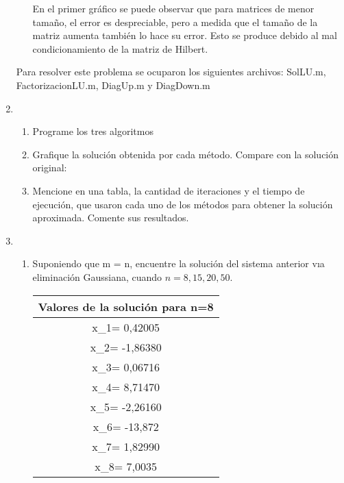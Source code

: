\documentclass{udpreport}
\begin{document}
\begin{enumerate}
\begin{enumerate}
\begin{figure}[H]
 			\end{figure}
 		
 			En el primer gráfico se puede observar que para matrices de menor tamaño, el error es despreciable, pero a medida que el tamaño de la matriz aumenta también lo hace su error. Esto se produce debido al mal condicionamiento de la matriz de Hilbert.
 		\end{enumerate}
 		
 	Para resolver este problema se ocuparon los siguientes archivos: SolLU.m, FactorizacionLU.m, DiagUp.m y DiagDown.m	
 	\newpage
 		\item
 	 \begin{enumerate}
 	    \item Programe los tres algoritmos
 	    \item  Grafique la solución obtenida por cada método. Compare con la solución original:
 	    \item Mencione en una tabla, la cantidad de iteraciones y el tiempo de ejecución, que usaron cada uno de los métodos para obtener la solución aproximada. Comente sus resultados.
 	  \end{enumerate}
      
        \item
                \begin{enumerate}
            \item Suponiendo que m = n, encuentre la solución del sistema anterior vıa eliminación Gaussiana, cuando $n = 8, 15, 20, 50$.
            \begin{table}[H]
        \centering
            \begin{tabular} {|c|}
            \hline
            Valores de la solución para n=8 \\
            \hline
            x_{1}=  0,42005\\
            \hline
            x_{2}=  -1,86380\\
            \hline
            x_{3}=  0,06716\\
            \hline
            x_{4}=  8,71470\\
            \hline
            x_{5}=  -2,26160\\
            \hline
            x_{6}=  -13,872\\
            \hline
            x_{7}=  1,82990\\
            \hline
            x_{8}=  7,0035\\
            \hline
            \end{tabular}
        \end{table}
        

\end{enumerate}
\end{enumerate}
\end{document}
